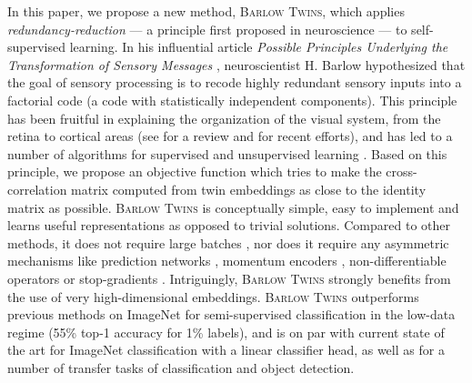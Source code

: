 \documentclass{article}
\newcommand{\AlgoName}{\textsc{Barlow Twins}}
\begin{document}
In this paper, we propose a new method, \AlgoName{}, which applies \emph{redundancy-reduction} --- a principle first proposed in neuroscience --- to self-supervised learning. In his influential article \emph{Possible Principles Underlying the Transformation of Sensory Messages} \citep{barlow_possible_nodate}, neuroscientist H. Barlow hypothesized that the goal of sensory processing is to recode highly redundant sensory inputs into a factorial code (a code with statistically independent components). This principle has been fruitful in explaining the organization of the visual system, from the retina to cortical areas (see \citep{barlow_redundancy_2001} for a review and \citep{ocko_emergence_2018,lindsey_unified_2020,schwartz_natural_2001} for recent efforts), and has led to a number of algorithms for supervised and unsupervised learning \citep{redlich_redundancy_1993,redlich_supervised_1993,deco_non-linear_1997,foldiak_forming_1990,linsker_self-organization_1988,schmidhuber_semilinear_1996,balle_end--end_2017}. Based on this principle, we propose an objective function which tries to make the cross-correlation matrix computed from twin embeddings as close to the identity matrix as possible. \AlgoName{} is conceptually simple, easy to implement and learns useful representations as opposed to trivial solutions. Compared to other methods, it does not require large batches \cite{chen2020simple}, nor does it require any asymmetric mechanisms like prediction networks \cite{grill2020bootstrap}, momentum encoders \cite{he2019momentum}, non-differentiable operators \cite{caron2020swav} or stop-gradients \cite{chen2020exploring}. Intriguingly, \AlgoName{} strongly benefits from the use of very high-dimensional embeddings. \AlgoName{} outperforms previous methods on ImageNet for semi-supervised classification in the low-data regime (55\% top-1 accuracy for 1\% labels), and is on par with current state of the art for ImageNet classification with a linear classifier head, as well as for a number of transfer tasks of classification and object detection. 
\end{document}
